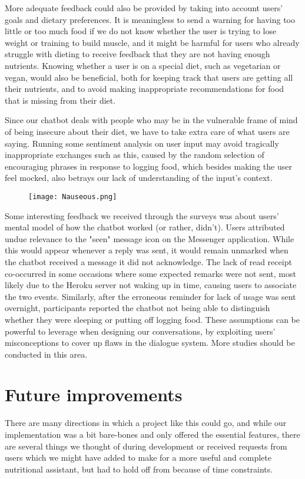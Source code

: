 More adequate feedback could also be provided by taking into account users' goals and dietary preferences. It is meaningless to send a warning for having too little or too much food if we do not know whether the user is trying to lose weight or training to build muscle, and it might be harmful for users who already struggle with dieting to receive feedback that they are not having enough nutrients. Knowing whether a user is on a special diet, such as vegetarian or vegan, would also be beneficial, both for keeping track that users are getting all their nutrients, and to avoid making inappropriate recommendations for food that is missing from their diet. 

Since our chatbot deals with people who may be in the vulnerable frame of mind of being insecure about their diet, we have to take extra care of what users are saying. Running some sentiment analysis on user input may avoid tragically inappropriate exchanges such as this, caused by the random selection of encouraging phrases in response to logging food, which besides making the user feel mocked, also betrays our lack of understanding of the input's context. \\

\begin{figure}[h!]
  \texttt{[image: Nauseous.png]}
\end{figure}

Some interesting feedback we received through the surveys was about users' mental model of how the chatbot worked (or rather, didn't). Users attributed undue relevance to the "seen" message icon on the Messenger application. While this would appear whenever a reply was sent, it would remain unmarked when the chatbot received a message it did not acknowledge. The lack of read receipt co-occurred in some occasions where some expected remarks were not sent, most likely due to the Heroku server not waking up in time, causing users to associate the two events. Similarly, after the erroneous reminder for lack of usage was sent overnight, participants reported the chatbot not being able to distinguish whether they were sleeping or putting off logging food. These assumptions can be powerful to leverage when designing our conversations, by exploiting users' misconceptions to cover up flaws in the dialogue system. More studies should be conducted in this area. 

\section{Future improvements} 
There are many directions in which a project like this could go, and while our implementation was a bit bare-bones and only offered the essential features, there are several things we thought of during development or received requests from users which we might have added to make for a more useful and complete nutritional assistant, but had to hold off from because of time constraints. 

